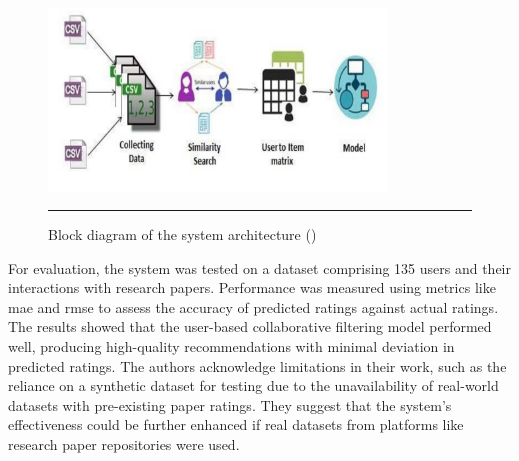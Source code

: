 \begin{figure}[htbp]
    \centering
 \includegraphics[width=0.8\textwidth]{03_Figures/literature-review/murali.png}
     \rule{35em}{0.5pt}
    \caption{Block diagram of the system architecture (\textcite{Murali2019})}
 \label{fig:murali}
\end{figure}

For evaluation, the system was tested on a dataset comprising 135 users and their interactions with research papers.
Performance was measured using metrics like \gls{mae} and \gls{rmse} to assess the accuracy of predicted ratings against actual ratings.
The results showed that the user-based collaborative filtering model performed well, producing high-quality recommendations with minimal deviation in predicted ratings.
The authors acknowledge limitations in their work, such as the reliance on a synthetic dataset for testing due to the unavailability of real-world datasets with pre-existing paper ratings.
They suggest that the system's effectiveness could be further enhanced if real datasets from platforms like research paper repositories were used.

